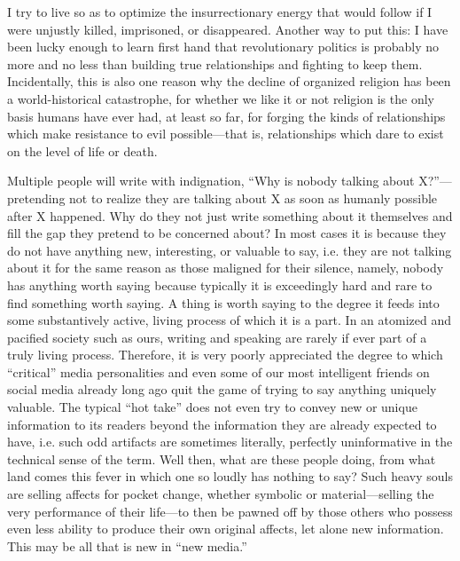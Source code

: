 \documentclass[12pt, twocolumn, oneside]{article}  	%
\begin{document}
\vspace{3em}

I try to live so as to optimize the insurrectionary energy that would follow if I were unjustly killed, imprisoned, or disappeared. Another way to put this: I have been lucky enough to learn first hand that revolutionary politics is probably no more and no less than building true relationships and fighting to keep them. Incidentally, this is also one reason why the decline of organized religion has been a world-historical catastrophe, for whether we like it or not religion is the only basis humans have ever had, at least so far, for forging the kinds of relationships which make resistance to evil possible---that is, relationships which dare to exist on the level of life or death.

\newpage


Multiple people will write with indignation, ``Why is nobody talking about X?''---pretending not to realize they are talking about X as soon as humanly possible after X happened. Why do they not just write something about it themselves and fill the gap they pretend to be concerned about? In most cases it is because they do not have anything new, interesting, or valuable to say, i.e. they are not talking about it for the same reason as those maligned for their silence, namely, nobody has anything worth saying because typically it is exceedingly hard and rare to find something worth saying. A thing is worth saying to the degree it feeds into some substantively active, living process of which it is a part. In an atomized and pacified society such as ours, writing and speaking are rarely if ever part of a truly living process. Therefore, it is very poorly appreciated the degree to which ``critical'' media personalities and even some of our most intelligent friends on social media already long ago quit the game of trying to say anything uniquely valuable. The typical ``hot take'' does not even try to convey new or unique information to its readers beyond the information they are already expected to have, i.e. such odd artifacts are sometimes literally, perfectly uninformative in the technical sense of the term. Well then, what are these people doing, from what land comes this fever in which one so loudly has nothing to say? Such heavy souls are selling affects for pocket change, whether symbolic or material---selling the very performance of their life---to then be pawned off by those others who possess even less ability to produce their own original affects, let alone new information. This may be all that is new in ``new media.''
\end{document}
